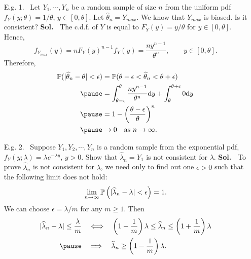 \begin{frame}
  \begin{enumerate}
   \item[E.g. 1.~] Let $Y_1,\cdots, Y_n$ be a random sample of size $n$ from the uniform pdf $f_Y(y;\theta) = 1/\theta$, $y\in [0,\theta]$. Let $\widehat\theta_n =Y_{max}$. We know that $Y_{max}$ is biased. Is it consistent?
   \vfill \pause
   {\noindent\bf Sol.~} The c.d.f. of $Y$ is equal to $F_Y(y) = y/\theta$ for $y\in[0,\theta]$. \pause Hence,
   \[
   f_{Y_{max}}(y) = n F_{Y}(y)^{n-1} f_Y(y) = \frac{n y^{n-1}}{\theta^n}, \qquad y\in [0,\theta].
   \] \pause
   Therefore,
   \begin{align*}
    \bbP(|\widehat\theta_n -\theta|<\epsilon) & = \bbP(\theta-\epsilon< \widehat\theta_n < \theta+\epsilon)\\ \pause
					      &= \int_{\theta-\epsilon}^\theta \frac{n y^{n-1}}{\theta^n }\ud y + \int_{\theta}^{\theta+\epsilon} 0 \ud y\\ \pause
    &= 1- \left(\frac{\theta-\epsilon}{\theta}\right)^n \\ \pause
    & \rightarrow 0 \quad \text{as $n\rightarrow\infty$.}
   \end{align*}
   \myEnd
  \end{enumerate}
 \end{frame}
\begin{frame}
 \begin{enumerate}
  \item[E.g. 2.~]  Suppose $Y_1 , Y_2 , \cdots, Y_n$ is a random sample from the
exponential pdf, $f_Y (y; \lambda) = \lambda e^{-\lambda y}$, $y > 0$.
Show that $\widehat\lambda_n = Y_1$ is not consistent for $\lambda$.
\vfill
 {\noindent\bf Sol.~}
 To prove $\widehat\lambda_n$ is not consistent for $\lambda$, we need only to find out one $\epsilon>0$ such that the following limit does not hold:
\begin{align}\label{E:573}
\lim_{n\rightarrow\infty} \mathbb{P}\left(|\widehat\lambda_n -\lambda|<\epsilon\right)=1.
\end{align} \pause
We can choose $\epsilon = \lambda/m$ for any $m\ge 1$. Then
\begin{align*}
|\widehat\lambda_n - \lambda| \le \frac{\lambda}{m}
& \quad\Longleftrightarrow\quad
\left(1-\frac{1}{m}\right)\lambda \le \widehat\lambda_n \le \left(1+\frac{1}{m}\right)\lambda
\\ \pause
& \quad \Longrightarrow \quad
\widehat\lambda_n \ge \left(1-\frac{1}{m}\right)\lambda.
\end{align*}
 \end{enumerate}
\end{frame}
